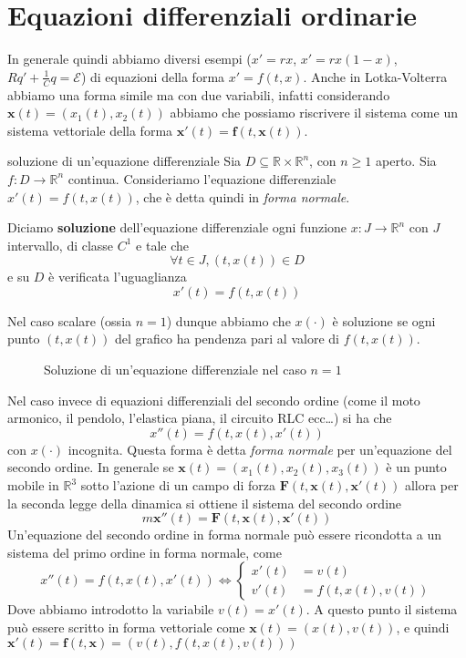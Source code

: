 \section{Equazioni differenziali ordinarie}
In generale quindi abbiamo diversi esempi (\(x' = rx\), \(x' = rx(1-x)\), \(Rq'
+ \frac{1}{C} q = \mathcal{E}\)) di equazioni della forma \(x' = f(t, x)\).
Anche in Lotka-Volterra abbiamo una forma simile ma con due variabili, infatti
considerando \(\mathbf{x}(t) = (x_{1}(t), x_{2}(t))\) abbiamo che possiamo
riscrivere il sistema come un sistema vettoriale della forma \(\mathbf{x}'(t) =
\mathbf{f}(t, \mathbf{x}(t))\).
\begin{definition}{soluzione di un'equazione differenziale}
    Sia \(D \subseteq \mathbb{R} \times \mathbb{R}^{n} \), con \(n \ge 1\)
    aperto. Sia \(f : D \to \mathbb{R}^{n}\) continua. Consideriamo l'equazione
    differenziale \(x'(t) = f(t, x(t))\), che è detta quindi in \emph{forma
    normale}.

    Diciamo \textbf{soluzione} dell'equazione differenziale ogni funzione \(x :
    J \to \mathbb{R}^{n}\) con \(J\) intervallo, di classe \(C^{1}\) e tale che 
    \[
        \forall t \in J, (t, x(t)) \in D
    \]
    e su \(D\) è verificata l'uguaglianza 
    \[
        x'(t) = f(t, x(t))
    \]
\end{definition}
Nel caso scalare (ossia \(n=1\)) dunque abbiamo che \(x(\cdot )\) è soluzione se ogni punto
\((t, x(t))\) del grafico ha pendenza pari al valore di \(f(t, x(t))\).
\begin{figure}[ht]
    \centering
    \caption{Soluzione di un'equazione differenziale nel caso \(n=1\) }\label{fig:pendenzagrafico}
\end{figure}

Nel caso invece di equazioni differenziali del secondo ordine (come il moto
armonico, il pendolo, l'elastica piana, il circuito RLC ecc\dots) si ha che 
\[
    x''(t) = f(t, x(t), x'(t))
\]
con \(x(\cdot )\) incognita. Questa forma è detta \emph{forma normale} per
un'equazione del secondo ordine.
In generale se \(\mathbf{x}(t) = (x_{1}(t), x_{2}(t), x_{3}(t)) \) è un punto
mobile in \(\mathbb{R}^{3}\) sotto l'azione di un campo di forza \(\mathbf{F}(t,
\mathbf{x}(t), \mathbf{x}'(t))\) allora per la seconda legge della dinamica si
ottiene il sistema del secondo ordine
\[
    m\mathbf{x}''(t) = \mathbf{F}(t, \mathbf{x}(t), \mathbf{x}'(t)) 
\]
Un'equazione del secondo ordine in forma normale può essere ricondotta a un
sistema del primo ordine in forma normale, come
\[
    x''(t) = f(t, x(t), x'(t)) \iff
    \begin{cases}
        x'(t) &= v(t) \\
        v'(t) &= f(t, x(t), v(t))
    \end{cases}
\]
Dove abbiamo introdotto la variabile \(v(t) = x'(t)\). A questo punto il sistema
può essere scritto in forma vettoriale come \(\mathbf{x}(t) = (x(t), v(t))\), e
quindi \(\mathbf{x}'(t) = \mathbf{f}(t, \mathbf{x}) = (v(t), f(t, x(t), v(t)))\) 

